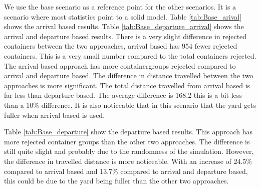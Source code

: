 \documentclass{article}
\begin{document}
We use the base scenario as a reference point for the other scenarios. It is a
scenario where most statistics point to a solid model. Table
\ref{tab:Base_arival} shows the arrival based results. Table
\ref{tab:Base_departure_arrival} shows the arrival and departure based results.
There is a very slight difference in rejected containers between the two
approaches, arrival based has 954 fewer rejected containers. This is a very
small number compared to the total containers rejected. The arrival based
approach has more containergroups rejected compared to arrival and departure
based. The difference in distance travelled between the two approaches is more
significant. The total distance travelled from arrival based is far less than
departure based. The average difference is 168.2 this is a bit less than a 10\%
difference. It is also noticeable that in this scenario that the yard gets
fuller when arrival based is used.

Table \ref{tab:Base_departure} show the departure based results. This approach
has more rejected container groups than the other two approaches. The
difference is still quite slight and probably due to the randomness of the
simulation. However, the difference in travelled distance is more noticeable.
With an increase of 24.5\% compared to arrival based and 13.7\% compared to
arrival and departure based, this could be due to the yard being fuller than
the other two approaches.
\end{document}
